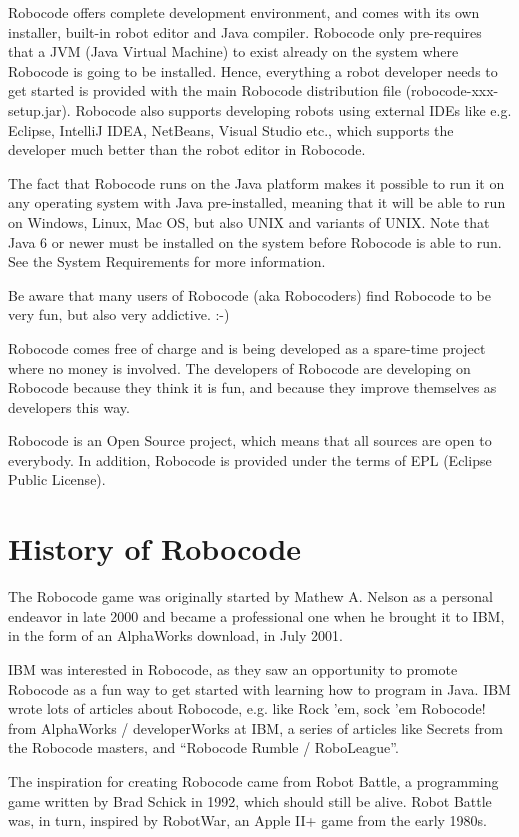 \documentclass{scrreprt}
\begin{document}
Robocode offers complete development environment, and comes with its own installer, built-in robot editor and Java compiler. Robocode only pre-requires that a JVM (Java Virtual Machine) to exist already on the system where Robocode is going to be installed. Hence, everything a robot developer needs to get started is provided with the main Robocode distribution file (robocode-xxx-setup.jar). Robocode also supports developing robots using external IDEs like e.g. Eclipse, IntelliJ IDEA, NetBeans, Visual Studio etc., which supports the developer much better than the robot editor in Robocode.

The fact that Robocode runs on the Java platform makes it possible to run it on any operating system with Java pre-installed, meaning that it will be able to run on Windows, Linux, Mac OS, but also UNIX and variants of UNIX. Note that Java 6 or newer must be installed on the system before Robocode is able to run. See the System Requirements for more information.

Be aware that many users of Robocode (aka Robocoders) find Robocode to be very fun, but also very addictive. :-)

Robocode comes free of charge and is being developed as a spare-time project where no money is involved. The developers of Robocode are developing on Robocode because they think it is fun, and because they improve themselves as developers this way.

Robocode is an Open Source project, which means that all sources are open to everybody. In addition, Robocode is provided under the terms of EPL (Eclipse Public License).

\section{History of Robocode}
The Robocode game was originally started by Mathew A. Nelson as a personal endeavor in late 2000 and became a professional one when he brought it to IBM, in the form of an AlphaWorks download, in July 2001.

IBM was interested in Robocode, as they saw an opportunity to promote Robocode as a fun way to get started with learning how to program in Java. IBM wrote lots of articles about Robocode, e.g. like Rock 'em, sock 'em Robocode! from AlphaWorks / developerWorks at IBM, a series of articles like Secrets from the Robocode masters, and ``Robocode Rumble / RoboLeague''.

The inspiration for creating Robocode came from Robot Battle, a programming game written by Brad Schick in 1992, which should still be alive. Robot Battle was, in turn, inspired by RobotWar, an Apple II+ game from the early 1980s.
\end{document}
